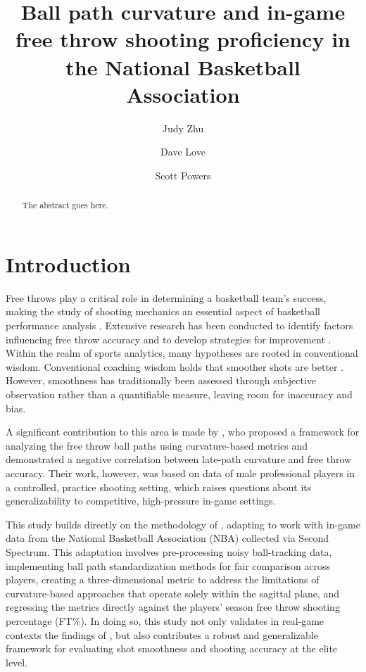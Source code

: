 \documentclass{article}
\title{Ball path curvature and in-game free throw shooting proficiency in the National Basketball Association}
\author[1]{Judy Zhu}
\author[2]{Dave Love}
\author[3]{Scott Powers}
\affil[1]{Department of Mathematics, Rice University}
\affil[2]{CDL Basketball Enterprises}
\affil[3]{Department of Sport Management, Rice University}
\begin{document}
  \maketitle

  \begin{abstract}
    The abstract goes here.
  \end{abstract}

  \section{Introduction}

    Free throws play a critical role in determining a basketball team's success, making the study of shooting mechanics an essential aspect of basketball performance analysis \citep{kozar_importance_1994}. Extensive research has been conducted to identify factors influencing free throw accuracy and to develop strategies for improvement \citep{tran_optimal_2008}. Within the realm of sports analytics, many hypotheses are rooted in conventional wisdom. Conventional coaching wisdom holds that smoother shots are better \citep{haefner_7_2010, penny_overlooked_2016}. However, smoothness has traditionally been assessed through subjective observation rather than a quantifiable measure, leaving room for inaccuracy and bias. 
    
    A significant contribution to this area is made by \citet{slegers_role_2024}, who proposed a framework for analyzing the free throw ball paths using curvature-based metrics and demonstrated a negative correlation between late-path curvature and free throw accuracy. Their work, however, was based on data of male professional  players in a controlled, practice shooting setting, which raises questions about its generalizability to competitive, high-pressure in-game settings. 

    This study builds directly on the methodology of \citet{slegers_role_2024}, adapting to work with in-game data from the National Basketball Association (NBA) collected via Second Spectrum. This adaptation involves pre-processing noisy ball-tracking data, implementing ball path standardization methods for fair comparison across players, creating a  three-dimensional metric to address the limitations of curvature-based approaches that operate solely within the sagittal plane, and regressing the metrics directly against the players' season free throw shooting percentage (FT\%). In doing so, this study not only validates in real-game contexts the findings of \citet{slegers_role_2024}, but also contributes a robust and generalizable framework for evaluating shot smoothness and shooting accuracy at the elite level.
\end{document}
